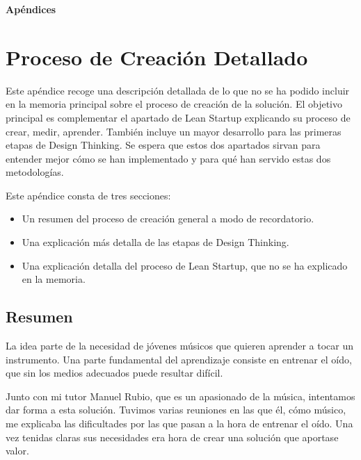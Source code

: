 \documentclass[12pt,twoside,titlepage]{report}
\begin{document}
{%

\appendix
{}
{}
\mbox{}
\vfill
\begin{center}
\begin{Huge}
\textbf{Apéndices}
\end{Huge}
\end{center}
\vfill
\mbox{}
\thispagestyle{empty}
\newpage
\mbox{}
\thispagestyle{empty}
\newpage


\chapter{Proceso de Creación Detallado}
Este apéndice recoge una descripción detallada de lo que no se ha podido incluir en la memoria principal sobre el proceso de creación de la solución. El objetivo principal es complementar el apartado de Lean Startup explicando su proceso de crear, medir, aprender. También incluye un mayor desarrollo para las primeras etapas de Design Thinking. Se espera que estos dos apartados sirvan para entender mejor cómo se han implementado y para qué han servido estas dos metodologías. 

Este apéndice consta de tres secciones:

\begin{itemize}
    \item Un resumen del proceso de creación general a modo de recordatorio.
    \item Una explicación más detalla de las etapas de Design Thinking.
    \item Una explicación detalla del proceso de Lean Startup, que no se ha explicado en la memoria.
\end{itemize}

\section{Resumen}
La idea parte de la necesidad de jóvenes músicos que quieren aprender a tocar un instrumento. Una parte fundamental del aprendizaje consiste en entrenar el oído, que sin los medios adecuados puede resultar difícil.

Junto con mi tutor Manuel Rubio, que es un apasionado de la música, intentamos dar forma a esta solución. Tuvimos varias reuniones en las que él, cómo músico, me explicaba las dificultades por las que pasan a la hora de entrenar el oído. Una vez tenidas claras sus necesidades era hora de crear una solución que aportase valor.

}
\end{document}
